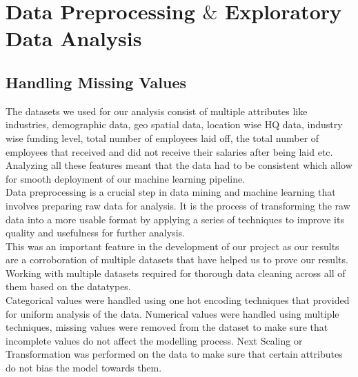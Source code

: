 \documentclass[fleqn,10pt]{SelfArx} %
\begin{document}

\section{Data Preprocessing $\&$ Exploratory Data Analysis} %


\subsection{Handling Missing Values}

The datasets we used for our analysis consist of multiple attributes like industries, demographic data, geo spatial data, location wise HQ data, industry wise funding level, total number of employees laid off, the total number of employees that received and did not receive their salaries after being laid etc. Analyzing all these features meant that the data had to be consistent which allow for smooth deployment of our machine learning pipeline.\\

Data preprocessing is a crucial step in data mining and machine learning that involves preparing raw data for analysis. It is the process of transforming the raw data into a more usable format by applying a series of techniques to improve its quality and usefulness for further analysis.\\

This was an important feature in the development of our project as our results are a corroboration of multiple datasets that have helped us to prove our results. Working with multiple datasets required for thorough data cleaning across all of them based on the datatypes.\\ 

Categorical values were handled using one hot encoding techniques that provided for uniform analysis of the data. Numerical values were handled using multiple techniques, missing values were removed from the dataset to make sure that incomplete values do not affect the modelling process. Next Scaling or Transformation was performed on the data to  make sure that certain attributes do not bias the model towards them. 
\end{document}
